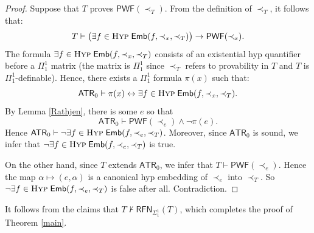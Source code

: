 \documentclass{amsart}
\theoremstyle{definition}
\theoremstyle{remark}
\begin{document}
\begin{proof}
Suppose that $T$ proves $\mathsf{PWF}(\prec_T)$. From the definition of $\prec_T$, it follows that:
$$T\vdash \big(\exists f\in \textsc{Hyp} \; \mathsf{Emb}(f,\prec_x,\prec_T)\big) \to \mathsf{PWF}(\prec_x).$$
The formula $\exists f\in \textsc{Hyp} \; \mathsf{Emb}(f,\prec_x,\prec_T)$ consists of an existential hyp quantifier before a $\Pi^1_1$ matrix (the matrix is $\Pi^1_1$ since $\prec_T$ refers to provability in $T$ and $T$ is $\Pi^1_1$-definable). Hence, there exists a $\Pi^1_1$ formula $\pi(x)$ such that:
$$\mathsf{ATR}_0\vdash \pi(x) \leftrightarrow \exists f\in \textsc{Hyp} \; \mathsf{Emb}(f,\prec_x,\prec_T).$$
By Lemma \ref{Rathjen}, there is some $e$ so that 
$$\mathsf{ATR}_0 \vdash \mathsf{PWF}(\prec_e) \wedge \neg\pi(e).$$
Hence $\mathsf{ATR}_0\vdash \neg \exists f\in \textsc{Hyp} \; \mathsf{Emb}(f,\prec_e,\prec_T)$. Moreover, since $\mathsf{ATR}_0$ is sound, we infer that $\neg \exists f\in \textsc{Hyp} \; \mathsf{Emb}(f,\prec_e,\prec_T)$ is true.

On the other hand, since $T$ extends $\mathsf{ATR}_0$, we infer that $T\vdash\mathsf{PWF}(\prec_e)$. Hence the map $\alpha\mapsto (e,\alpha)$ is a canonical hyp embedding of $\prec_e$ into $\prec_T$. So $\neg \exists f\in \textsc{Hyp} \; \mathsf{Emb}(f,\prec_e,\prec_T)$ is false after all. Contradiction.
\end{proof}

It follows from the claims that $T\nvdash \mathsf{RFN}_{\Sigma^1_1}(T)$, which completes the proof of Theorem \ref{main}.


\end{document}

